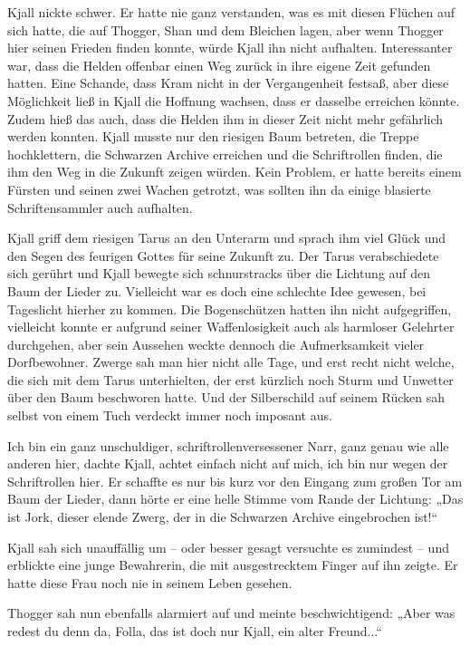 \documentclass[10pt, a4paper, oneside]{book}
\begin{document}
Kjall nickte schwer. Er hatte nie ganz verstanden, was es mit diesen Flüchen auf sich hatte, die auf Thogger, Shan und dem Bleichen lagen, aber wenn Thogger hier seinen Frieden finden konnte, würde Kjall ihn nicht aufhalten. Interessanter war, dass die Helden offenbar einen Weg zurück in ihre eigene Zeit gefunden hatten. Eine Schande, dass Kram nicht in der Vergangenheit festsaß, aber diese Möglichkeit ließ in Kjall die Hoffnung wachsen, dass er dasselbe erreichen könnte. Zudem hieß das auch, dass die Helden ihm in dieser Zeit nicht mehr gefährlich werden konnten. Kjall musste nur den riesigen Baum betreten, die Treppe hochklettern, die Schwarzen Archive erreichen und die Schriftrollen finden, die ihm den Weg in die Zukunft zeigen würden. Kein Problem, er hatte bereits einem Fürsten und seinen zwei Wachen getrotzt, was sollten ihn da einige blasierte Schriftensammler auch aufhalten.

Kjall griff dem riesigen Tarus an den Unterarm und sprach ihm viel Glück und den Segen des feurigen Gottes für seine Zukunft zu. Der Tarus verabschiedete sich gerührt und Kjall bewegte sich schnurstracks über die Lichtung auf den Baum der Lieder zu. Vielleicht war es doch eine schlechte Idee gewesen, bei Tageslicht hierher zu kommen. Die Bogenschützen hatten ihn nicht aufgegriffen, vielleicht konnte er aufgrund seiner Waffenlosigkeit auch als harmloser Gelehrter durchgehen, aber sein Aussehen weckte dennoch die Aufmerksamkeit vieler Dorfbewohner. Zwerge sah man hier nicht alle Tage, und erst recht nicht welche, die sich mit dem Tarus unterhielten, der erst kürzlich noch Sturm und Unwetter über den Baum beschworen hatte. Und der Silberschild auf seinem Rücken sah selbst von einem Tuch verdeckt immer noch imposant aus.

Ich bin ein ganz unschuldiger, schriftrollenversessener Narr, ganz genau wie alle anderen hier, dachte Kjall, achtet einfach nicht auf mich, ich bin nur wegen der Schriftrollen hier. Er schaffte es nur bis kurz vor den Eingang zum großen Tor am Baum der Lieder, dann hörte er eine helle Stimme vom Rande der Lichtung: „Das ist Jork, dieser elende Zwerg, der in die Schwarzen Archive eingebrochen ist!“

Kjall sah sich unauffällig um – oder besser gesagt versuchte es zumindest – und erblickte eine junge Bewahrerin, die mit ausgestrecktem Finger auf ihn zeigte. Er hatte diese Frau noch nie in seinem Leben gesehen.

Thogger sah nun ebenfalls alarmiert auf und meinte beschwichtigend: „Aber was redest du denn da, Folla, das ist doch nur Kjall, ein alter Freund...“
\end{document}
